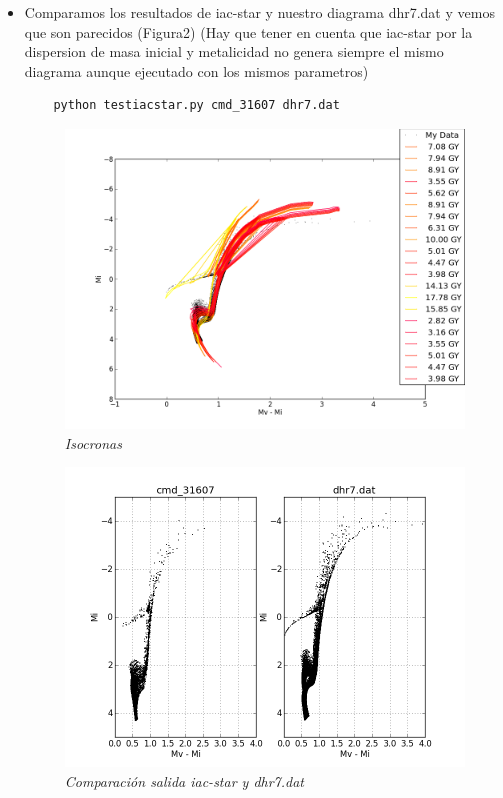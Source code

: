 \documentclass[10pt]{book}
\begin{document}
\begin{itemize}
\item Comparamos los resultados de iac-star y nuestro diagrama dhr7.dat y vemos que son parecidos (Figura2) (Hay que tener en cuenta que iac-star por la dispersion de masa inicial y metalicidad no genera siempre el mismo diagrama aunque ejecutado con los mismos parametros) 
\begin{verbatim}
	python testiacstar.py cmd_31607 dhr7.dat
\end{verbatim}


\begin{figure}[!h]
 \centering
 \includegraphics[scale=0.7]{alllines.png}
 \caption{\emph{Isocronas}}
 \label{Fig: 1}
\end{figure}

\begin{figure}[!h]
 \centering
 \includegraphics[scale=0.7]{cmd_31607.png}
 \caption{\emph{Comparación salida iac-star y  dhr7.dat}}
 \label{Fig: 2}
\end{figure}
\end{itemize}
\end{document}
